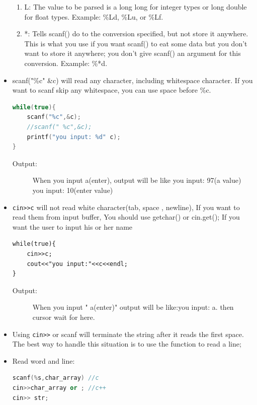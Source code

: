 \documentclass[a4paper,11pt,twoside]{book}
\begin{document}
\begin{itemize}
\begin{enumerate}
		\item L: The value to be parsed is a long long for integer types or long double for float types. Example: \%Ld, \%Lu, or \%Lf.
		
		\item *: Tells scanf() do to the conversion specified, but not store it anywhere. This is what you use if you want scanf() to eat some data but you don't want to store it anywhere; you don't give scanf() an argument for this conversion. Example: \%*d.
	\end{enumerate}
	
	
	\item scanf("\%c" \&c) will read any character, including whitespace character. If you want to scanf skip any whitespace, you can use space before \%c.
	
\begin{lstlisting}[frame=single, language=c++, mathescape=true]
while(true){
	scanf("%c",&c);
	//scanf(" %c",&c);
	printf("you input: %d" c);
}
\end{lstlisting}
\begin{description}
	\item[Output:] When you input a(enter), output will be like
	you input: 97(a value)
	you input: 10(enter value)
\end{description}
	
	\item \verb=cin>>c= will not read white character(tab, space , newline), If you want to read them from input buffer, You should use getchar() or cin.get(); If you want the user to input his or her name
\begin{lstlisting}
while(true){
	cin>>c;
	cout<<"you input:"<<c<<endl;
}
	\end{lstlisting}
	\begin{description}
		\item[Output:] When you input  "    a(enter)"
		output will be like:you input:  a. then cursor wait for here.
	\end{description}
	
	\item Using \verb=cin>>= or scanf will terminate the string after it reads the first space. The best way to handle this situation is to use the function to read a line;
	
	\item Read word and line:
\begin{lstlisting}[frame=single, language=c++]
scanf(%s,char_array) //c
cin>>char_array or ; //c++
cin>> str;
	

\end{lstlisting}
\end{itemize}
\end{document}
